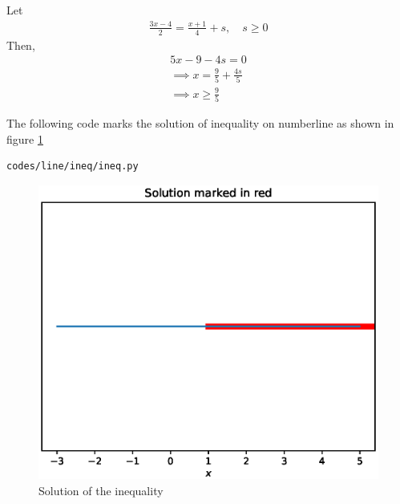 Let 
% 
\begin{align}
\frac{3x-4}{2} = \frac{x+1}{4} + s,  \quad s \geq 0
\end{align}
Then, 
\begin{align}
5x -9 -4s = 0 
\\
\implies x=\frac{9}{5}+\frac{4s}{5}
\\
\implies x \geq \frac{9}{5}
\end{align}

The following code marks the solution of inequality on numberline as shown in figure \ref{fig:3.11.3_ineq_py}
\begin{lstlisting}
codes/line/ineq/ineq.py
\end{lstlisting}
\begin{figure}[!ht]
\centering
\includegraphics[width=\columnwidth]{./solutions/3/codes/line/ineq/pyfigs/ineq.eps}
\caption{Solution of the inequality}
\label{fig:3.11.3_ineq_py}
\end{figure}

